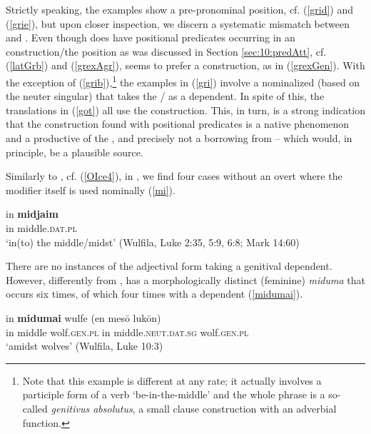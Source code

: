 \documentclass[output=paper,colorlinks,citecolor=brown]{langscibook}
\begin{document}
\begin{sloppypar}
Strictly speaking, the  examples show a pre-pronominal position, cf. (\ref{grid}) and (\ref{grie}), but upon closer inspection, we discern a systematic mismatch between  and .   
Even though   does have positional predicates occurring in an  construction/the  position as was discussed in Section \ref{sec:10:predAtt}, cf. (\ref{latGrb}) and (\ref{grexAgr}),  seems to prefer a  construction, as in  (\ref{grexGen}). With the exception of (\ref{grib}),\footnote{Note that this example is different at any rate; it actually involves a participle form of a verb `be-in-the-middle' and the whole phrase is a so-called \textit{genitivus absolutus}, a small clause construction with an adverbial function.} the  examples in (\ref{gri})  involve a nominalized  (based on the neuter singular) that takes the / as a  dependent. In spite of this, the  translations in (\ref{got}) all use the  construction. This, in turn, is a strong indication that the   construction found with positional predicates is a native phenomenon and a productive  of the  , and precisely not a borrowing from  -- which would, in principle, be a plausible source.
\end{sloppypar}

Similarly to , cf. (\ref{OIce4}), in , we find four cases without an overt  where the modifier itself is used nominally (\ref{mi}). 

\begin{exe}
   \ex \label{mi} \gll   in \textbf{midj{aim}}  \\ 
      in middle.\textsc{dat.pl}  \\ 
       \glt `in(to) the middle/midst' (Wulfila, Luke 2:35, 5:9, 6:8; Mark 14:60) 
\end{exe}  

There are no instances of the adjectival form taking a genitival dependent. However, differently from ,  has a morphologically distinct (feminine)  \textit{miduma} that occurs six times, of which four times with a  dependent (\ref{midumai}).

\begin{exe}
    \ex \label{midumai}\gll in \textbf{midumai}  wulfe\hspace{20mm} (en  mes\=o  luk\=on) \\ 
       in middle wolf.\textsc{gen.pl}  { in} middle.\textsc{neut.dat.sg} wolf.\textsc{gen.pl}    \\
      \glt `amidst wolves' (Wulfila,  Luke 10:3)
\end{exe} 
\end{document}
